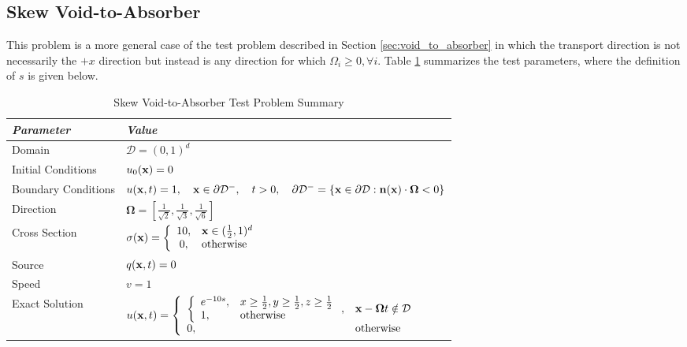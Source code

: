 \subsection{Skew Void-to-Absorber}\label{sec:skew_void_to_absorber}
This problem is a more general case of the test problem described in
Section \ref{sec:void_to_absorber} in which the transport direction is
not necessarily the $+x$ direction but instead is any direction for which
$\Omega_i\ge 0,\forall i$.
Table \ref{tab:void_to_absorber_skew} summarizes the test parameters,
where the definition of $s$ is given below.

\begin{table}[h]\caption{Skew Void-to-Absorber Test Problem Summary}
\label{tab:void_to_absorber_skew}
\centering
\begin{tabular}{l l}\toprule
\emph{Parameter} & \emph{Value}\\\midrule
Domain & $\mathcal{D} = (0,1)^d$\\
Initial Conditions & $u_0(\mathbf{x})=0$\\
Boundary Conditions & $u(\mathbf{x},t)=1,\quad \mathbf{x}\in\partial\mathcal{D}^-,\quad t>0,
   \quad\partial\mathcal{D}^-=\{\mathbf{x}\in\partial\mathcal{D}:\mathbf{n}(\mathbf{x})
   \cdot\mathbf{\Omega}<0\}$\\
Direction & $\mathbf{\Omega} = \left[\frac{1}{\sqrt{2}},\frac{1}{\sqrt{3}},
   \frac{1}{\sqrt{6}}\right]$\\
Cross Section & $\sigma(\mathbf{x})=\left\{\begin{array}{c l}
   10, & \mathbf{x}\in(\frac{1}{2},1)^d\\
   0,  & \mbox{otherwise}\end{array}\right.$\\
Source & $q(\mathbf{x},t)=0$\\
Speed & $v=1$\\
Exact Solution & $u(\mathbf{x},t)=\left\{\begin{array}{l l}
   \left\{\begin{array}{l l}
      e^{-10s}, & x\ge\frac{1}{2}, y\ge\frac{1}{2}, z\ge\frac{1}{2}\\
      1,        & \mbox{otherwise}
   \end{array}\right., & \mathbf{x}-\mathbf{\Omega}t\notin\mathcal{D}\\
   0, & \mbox{otherwise}
   \end{array}\right.$ \\
\bottomrule\end{tabular}
\end{table}

